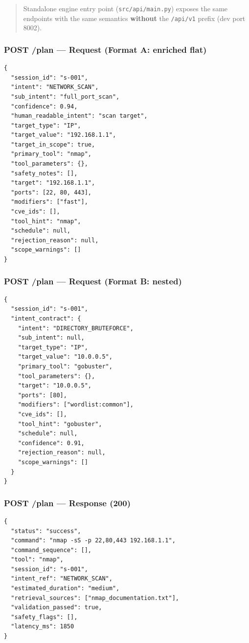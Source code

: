 \documentclass[10pt,journal,onecolumn]{IEEEtran}
\begin{document}
\begin{quote}\small Standalone engine entry point (\texttt{src/api/main.py}) exposes the same endpoints with the same semantics \textbf{without} the \texttt{/api/v1} prefix (dev port 8002).\end{quote}

\subsubsection{POST /plan --- Request (Format A: enriched flat)}

\begin{lstlisting}
{
  "session_id": "s-001",
  "intent": "NETWORK_SCAN",
  "sub_intent": "full_port_scan",
  "confidence": 0.94,
  "human_readable_intent": "scan target",
  "target_type": "IP",
  "target_value": "192.168.1.1",
  "target_in_scope": true,
  "primary_tool": "nmap",
  "tool_parameters": {},
  "safety_notes": [],
  "target": "192.168.1.1",
  "ports": [22, 80, 443],
  "modifiers": ["fast"],
  "cve_ids": [],
  "tool_hint": "nmap",
  "schedule": null,
  "rejection_reason": null,
  "scope_warnings": []
}
\end{lstlisting}

\subsubsection{POST /plan --- Request (Format B: nested)}

\begin{lstlisting}
{
  "session_id": "s-001",
  "intent_contract": {
    "intent": "DIRECTORY_BRUTEFORCE",
    "sub_intent": null,
    "target_type": "IP",
    "target_value": "10.0.0.5",
    "primary_tool": "gobuster",
    "tool_parameters": {},
    "target": "10.0.0.5",
    "ports": [80],
    "modifiers": ["wordlist:common"],
    "cve_ids": [],
    "tool_hint": "gobuster",
    "schedule": null,
    "confidence": 0.91,
    "rejection_reason": null,
    "scope_warnings": []
  }
}
\end{lstlisting}

\subsubsection{POST /plan --- Response (200)}

\begin{lstlisting}
{
  "status": "success",
  "command": "nmap -sS -p 22,80,443 192.168.1.1",
  "command_sequence": [],
  "tool": "nmap",
  "session_id": "s-001",
  "intent_ref": "NETWORK_SCAN",
  "estimated_duration": "medium",
  "retrieval_sources": ["nmap_documentation.txt"],
  "validation_passed": true,
  "safety_flags": [],
  "latency_ms": 1850
}
\end{lstlisting}
\end{document}
